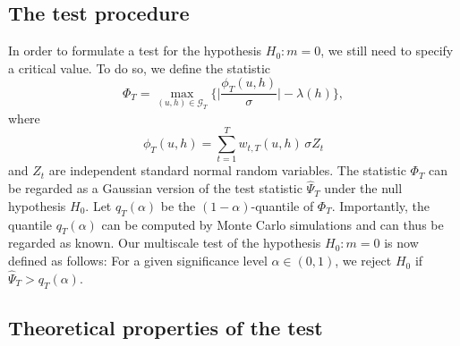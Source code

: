 \documentclass[a4paper,12pt]{article}
\numberwithin{equation}{section}
\begin{document}
\subsection{The test procedure}\label{subsec-method-test}


In order to formulate a test for the hypothesis $H_0: m = 0$, we still need to specify a critical value. To do so, we define the statistic
\begin{equation}\label{Phi-statistic}
\Phi_T = \max_{(u,h) \in \mathcal{G}_T} \Big\{ \Big|\frac{\phi_T(u,h)}{\sigma}\Big| - \lambda(h) \Big\},
\end{equation} 
where
\[ \phi_T(u,h) = \sum\limits_{t=1}^T w_{t,T}(u,h) \, \sigma Z_t \]
and $Z_t$ are independent standard normal random variables. The statistic $\Phi_T$ can be regarded as a Gaussian version of the test statistic $\widehat{\Psi}_T$ under the null hypothesis $H_0$. Let $q_T(\alpha)$ be the $(1-\alpha)$-quantile of $\Phi_T$. Importantly, the quantile $q_T(\alpha)$ can be computed by Monte Carlo simulations and can thus be regarded as known. Our multiscale test of the hypothesis $H_0: m = 0$ is now defined as follows: For a given significance level $\alpha \in (0,1)$, we reject $H_0$ if $\widehat{\Psi}_T > q_T(\alpha)$. 


\subsection{Theoretical properties of the test}\label{subsec-method-theo}
\end{document}

